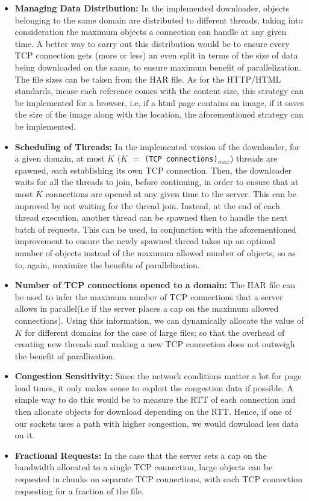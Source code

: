 \documentclass[12pt]{article}
\begin{document}
\begin{itemize}
\item \textbf{Managing Data Distribution:} In the implemented downloader, objects belonging to the same domain are distributed to different threads, taking into consideration the maximum objects a connection can handle at any given time. A better way to carry out this distribution would be to ensure every TCP connection gets (more or less) an even split in terms of the size of data being downloaded on the same, to ensure maximum benefit of parallelization. The file sizes can be taken from the HAR file. As for the HTTP/HTML standards, incase each reference comes with the content size, this strategy can be implemented for a browser, i.e, if a html page contains an image, if it saves the size of the image along with the location, the aforementioned strategy can be implemented.
\item \textbf{Scheduling of Threads:} In the implemented version of the downloader, for a given domain, at most $K$ ($K$ $=$ \texttt{(TCP connections)$_{max}$}) threads are spawned, each establishing its own TCP connection. Then, the downloader waits for all the threads to join, before continuing, in order to ensure that at most $K$ connections are opened at any given time to the server. This can be improved by not waiting for the thread join. Instead, at the end of each thread execution, another thread can be spawned then to handle the next batch of requests. This can be used, in conjunction with the aforementioned improvement to ensure the newly spawned thread takes up an optimal number of objects instead of the maximum allowed number of objects, so as to, again, maximize the benefits of parallelization.  
\item \textbf{Number of TCP connections opened to a domain:} The HAR file can be used to infer the maximum number of TCP connections that a server allows in parallel(i.e if the server places a cap on the maximum allowed connections). Using this information, we can dynamically allocate the value of $K$ for different domains for the case of large files; so that the overhead of creating new threads and making a new TCP connection does not outweigh the benefit of parallization. 
\item \textbf{Congestion Sensitivity:} Since the network conditions matter a lot for page load times, it only makes sense to exploit the congestion data if possible. A simple way to do this would be to measure the RTT of each connection and then allocate objects for download depending on the RTT. Hence, if one of our sockets uses a path with higher congestion, we would download less data on it.
\item \textbf{Fractional Requests:} In the case that the server sets a cap on the bandwidth allocated to a single TCP connection, large objects can be requested in chunks on separate TCP connections, with each TCP connection requesting for a fraction of the file.
\end{itemize}
\end{document}

